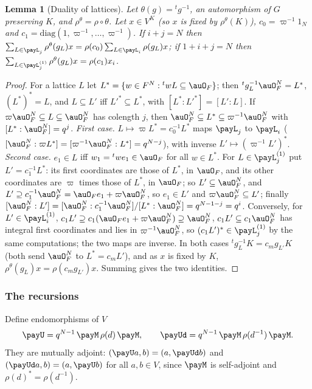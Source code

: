 \documentclass[10pt]{amsart}
\newtheorem{lemma}[theorem]{Lemma}
\theoremstyle{definition}
\theoremstyle{remark}
\begin{document}
\begin{lemma}[Duality of lattices]\label{pay:dual}
Let $\theta(g)={}^tg^{-1}$, an automorphism of $G$ preserving $K$, and $\rho^\theta=\rho\circ\theta$.
Let $x\in V^K$ (so $x$ is fixed by $\rho^\theta(K)$), $c_0=\varpi^{-1}1_N$ and $c_1=\mathrm{diag}(1,
\varpi^{-1},\dots,\varpi^{-1})$. If $i+j=N$ then $\sum_{L\in\payL_j}\rho^\theta(g_L)x=\rho(c_0)
\sum_{L\in\payL_i}\rho(g_L)x$; if $1+i+j=N$ then $\sum_{L\in\payL^{(1)}_j}\rho^\theta(g_L)x=\rho(c_1)
x_i$.
\end{lemma}
\begin{proof}
For a lattice $L$ let $L^*=\{w\in F^N:{}^twL\subseteq\auO_F\}$; then ${}^tg_L^{-1}\auO_F^N=L^*$,
$(L^*)^*=L$, and $L\subseteq L'$ iff $L'^*\subseteq L^*$, with $[L^*:L'^*]=[L':L]$. If $\varpi
\auO_F^N\subseteq L\subseteq\auO_F^N$ has colength $j$, then $\auO_F^N\subseteq L^*\subseteq\varpi^{-1}
\auO_F^N$ with $[L^*:\auO_F^N]=q^j$. \emph{First case.} $L\mapsto\varpi L^*=c_0^{-1}L^*$ maps $\payL_j$
to $\payL_i$ ($[\auO_F^N:\varpi L^*]=[\varpi^{-1}\auO_F^N:L^*]=q^{N-j}$), with inverse $L'\mapsto
(\varpi^{-1}L')^*$. \emph{Second case.} $e_1\in L$ iff $w_1={}^twe_1\in\auO_F$ for all $w\in L^*$. For
$L\in\payL^{(1)}_j$ put $L'=c_1^{-1}L^*$: its first coordinates are those of $L^*$, in $\auO_F$, and
its other coordinates are $\varpi$ times those of $L^*$, in $\auO_F$; so $L'\subseteq\auO_F^N$, and
$L'\supseteq c_1^{-1}\auO_F^N=\auO_Fe_1+\varpi\auO_F^N$, so $e_1\in L'$ and $\varpi\auO_F^N\subseteq
L'$; finally $[\auO_F^N:L']=[\auO_F^N:c_1^{-1}\auO_F^N]/[L^*:\auO_F^N]=q^{N-1-j}=q^i$. Conversely, for
$L'\in\payL^{(1)}_i$, $c_1L'\supseteq c_1(\auO_Fe_1+\varpi\auO_F^N)\supseteq\auO_F^N$, $c_1L'\subseteq
c_1\auO_F^N$ has integral first coordinates and lies in $\varpi^{-1}\auO_F^N$, so $(c_1L')^*\in
\payL^{(1)}_j$ by the same computations; the two maps are inverse. In both cases ${}^tg_L^{-1}K=c_m
g_{L'}K$ (both send $\auO_F^N$ to $L^*=c_mL'$), and as $x$ is fixed by $K$, $\rho^\theta(g_L)x=\rho(
c_mg_{L'})x$. Summing gives the two identities.
\end{proof}

\subsubsection{The recursions}\label{pay:ss-rec}

Define endomorphisms of $V$
\[
\payU=q^{N-1}\,\payM\,\rho(d)\,\payM,\qquad\payUd=q^{N-1}\,\payM\,\rho(d^{-1})\,\payM .
\]
They are mutually adjoint: $(\payU a,b)=(a,\payUd b)$ and $(\payUd a,b)=(a,\payU b)$ for all $a,b\in V$,
since $\payM$ is self-adjoint and $\rho(d)^*=\rho(d^{-1})$.
\end{document}

